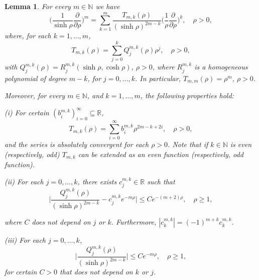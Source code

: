 \documentclass[10pt,a4paper]{amsart}
\newtheorem{lem}{Lemma}
\begin{document}
\begin{lem}\label{key}
For every $m\in \mathbb N$ we have 
\begin{equation}\label{formderiv}
\Big(\frac{1}{\sinh \rho }\frac{\partial }{\partial\rho }\Big)^m=\sum_{k=1}^m\frac{T_{m,k}(\rho )}{(\sinh \rho)^{2m-k}}\Big(\frac{1}{\rho }\frac{\partial }{\partial\rho }\Big)^k,\quad \rho >0,
\end{equation}
where, for each $k=1,\ldots, m$, 
\begin{equation}\label{Tmk}
T_{m,k}(\rho )=\sum_{j=0}^k Q_j^{m,k}(\rho )\rho ^j,\quad \rho >0,
\end{equation}
with $Q_j^{m,k}(\rho )=R_j^{m,k}(\sinh \rho ,\cosh \rho)$, $\rho >0$, where $R_j^{m,k}$ is a homogeneous polynomial of degree $m-k$, for $j=0,\ldots , k$. In particular, $T_{m,m}(\rho )=\rho  ^m$, $\rho >0$.

Moreover, for every $m\in \mathbb N$, and $k=1,\ldots, m$, the following properties hold:

(i) For certain $(b_i^{m,k})_{i=0}^\infty\subseteq \mathbb R$, 
$$
T_{m,k}(\rho )=\sum_{i=0}^\infty b_i^{m,k}\rho ^{2m-k+2i},\quad \rho >0,
$$
and the series is absolutely convergent for each $\rho >0$. Note that if $k\in \mathbb N$ is even (respectively, odd) $T_{m,k}$ can be extended as an even function (respectively, odd function).

(ii) For each $j=0,\ldots,k$, there exists $c_j^{m,k}\in \mathbb R$ such that
$$
\Big|\frac{Q_j^{m,k}(\rho )}{(\sinh \rho )^{2m-k}}-c_j^{m,k}e^{-m\rho }\Big|\leq Ce^{-(m+2)\rho},\quad \rho \geq 1,
$$

where $C$ does not depend on $j$ or $k$. Furthermore, $|c_k^{m,k}|=(-1)^{m+k}c_k^{m,k}$.

(iii) For each $j=0,\ldots,k$, 
$$
\Big|\frac{Q_j^{m,k}(\rho )}{(\sinh \rho )^{2m-k}}\Big|\leq Ce^{-m\rho },\quad \rho \geq 1,
$$
for certain $C>0$ that does not depend on $k$ or $j$.
\end{lem}
\end{document}
